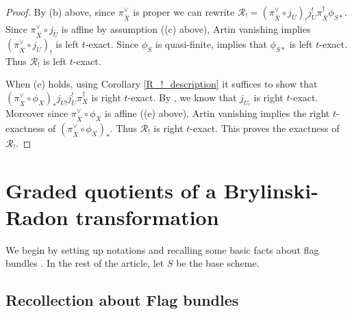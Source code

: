 \documentclass[12pt, reqno]{amsart}
\theoremstyle{plain}
\theoremstyle{definition}
\theoremstyle{definition}
\newcommand{\cR}{{\mathcal R}}
\begin{document}
\begin{proof}
By (b) above, since $\pi_{\overline{X}}^{\vee}$ is proper we can rewrite $\cR_{!}=(\pi_{\overline{X}}^{\vee} \circ j_{\overline{U}})_!j_{\overline{U}}^!\pi_{\overline{X}}^{\dagger}\phi_{S*}$. Since $\pi_{\overline{X}}^{\vee} \circ j_{\overline{U}}$ is affine by assumption ((c) above), Artin vanishing implies $(\pi_{\overline{X}}^{\vee} \circ j_{\overline{U}})_!$ is left $t$-exact. Since $\phi_S$ is quasi-finite, \cite[Proposition 2.2.5]{BBDG18} implies that $\phi_{S*}$ is left $t$-exact. Thus $\cR_{!}$ is left $t$-exact.

When (e) holds, using Corollary \ref{R_!_description} it suffices to show that $(\pi_{\overline{X}}^{\vee}\circ \phi_X)_* j_{U!}j_{U}^{!}\pi_X^{\dagger}$ is right $t$-exact. By \cite[\S 4.2.4]{BBDG18}, we know that $j_{U_!}$ is right $t$-exact. Moreover since $\pi_{\overline{X}}^{\vee}\circ \phi_X$ is affine ((e) above), Artin vanishing implies the right $t$-exactness of $(\pi_{\overline{X}}^{\vee}\circ \phi_X)_*$. Thus $\cR_{!}$ is right $t$-exact. This proves the exactness of $\cR_{!}$.
\end{proof}



\section{Graded quotients of a Brylinski-Radon transformation}\label{Brylinski-Radon_Flag}

We begin by setting up notations and recalling some basic facts about flag bundles \cite[Expose VI, \S 4]{SGA6}. In the rest of the article, let $S$ be the base scheme. 

\subsection{Recollection about Flag bundles}\label{Flag_Variety_Notation}
\end{document}
